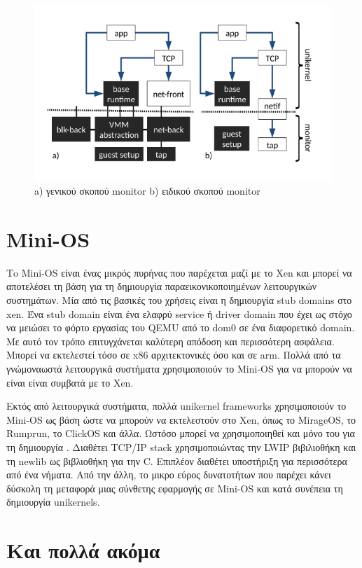 \begin{figure}[htp]
\centering
\includegraphics[scale=0.6]{figures/solo5.png}
\caption{a) γενικού σκοπού monitor b) ειδικού σκοπού monitor\label{fig3_8}}
\end{figure}

\section{Mini-OS}

Τo Mini-OS είναι ένας μικρός πυρήνας που παρέχεται μαζί με το Xen και μπορεί να
αποτελέσει τη βάση για τη δημιουργία παραεικονικοποιημένων λειτουργικών
συστημάτων. Μία από τις βασικές του χρήσεις είναι η δημιουργία stub domains στο
xen. Ένα stub domain είναι ένα ελαφρύ service ή driver domain που έχει ως στόχο
να μειώσει το φόρτο εργασίας του QEMU από το dom0 σε ένα διαφορετικό domain. Με
αυτό τον τρόπο επιτυγχάνεται καλύτερη απόδοση και περισσότερη ασφάλεια. Μπορεί
να εκτελεστεί τόσο σε x86 αρχιτεκτονικές όσο και σε arm. Πολλά από τα
γνώμοναωστά λειτουργικά συστήματα χρησιμοποιούν το Mini-OS για να μπορούν να
είναι είναι συμβατά με το Xen.

Εκτός από λειτουργικά συστήματα, πολλά unikernel frameworks χρησιμοποιούν το
Mini-OS ως βάση ώστε να μπορούν να εκτελεστούν στο Xen, όπως το MirageOS, το
Rumprun, το ClickOS και άλλα. Ωστόσο  μπορεί να χρησιμοποιηθεί και μόνο του για
τη δημιουργία . Διαθέτει TCP/IP stack χρησιμοποιώντας την LWIP
βιβιλιοθήκη και τη newlib ως βιβλιοθήκη για την C. Επιπλέον διαθέτει υποστήριξη
για περισσότερα από ένα νήματα. Από την άλλη, το μικρο εύρος δυνατοτήτων που
παρέχει κάνει δύσκολη τη μεταφορά μιας σύνθετης εφαρμογής σε Mini-OS και κατά
συνέπεια τη δημιουργία unikernels.

\section{Και πολλά ακόμα}

